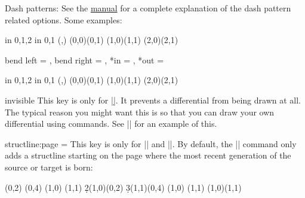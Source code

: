 \begin{sseqdata}[|| name = ex1, cohomological Serre grading]
\begin{manualentry}{Dash patterns:}
See the \href{\pgfmanualurl#subsubsection.15.3.2}{\tikzpkg\space manual} for a complete explanation of the dash pattern related options. Some examples:
\begin{codeexample}[width = 6cm]
\begin{sseqpage}[ no axes, yscale = 1.6 ]
\foreach \x in {0,1,2} \foreach \y in {0,1} {
    \class(\x,\y)
}
(0,0)(0,1)
(1,0)(1,1)
(2,0)(2,1)
\end{sseqpage}
\end{codeexample}
%
\end{manualentry}

\begin{keylist}{bend left = , bend right = , *in = , *out = }
\begin{codeexample}[width = 6cm]
\begin{sseqpage}[no axes,yscale = 1.6]
\foreach \x in {0,1,2} \foreach \y in {0,1} {
    \class(\x,\y)
}
\structline[bend left = 20](0,0)(0,1)
\structline[bend right = 20](1,0)(1,1)
\structline[in = 20,out = north](2,0)(2,1)
\end{sseqpage}
\end{codeexample}
\end{keylist}

\begin{key}{invisible}
This key is only for |\d|. It prevents a differential from being drawn at all. The typical reason you might want this is so that you can draw your own differential using \tikzpkg\space commands. See |\getdtarget| for an example of this.
\end{key}

\begin{key}{structline:page = }
This key is only for |\structline| and |\structlineoptions|. By default, the |\structline| command only adds a structline starting on the page where the most recent generation of the source or target is born:

\begin{codeexample}[width = 7.6cm]
\begin{sseqdata}[ name = structpage example,
                  title = \page, yscale = 0.53 ]
\class(0,2)
\class(0,4)
\class(1,0)
\class(1,1)
\d2(1,0)(0,2)
\d3(1,1)(0,4)
\replaceclass(1,0)
\replaceclass(1,1)
\structline(1,0)(1,1)
\end{sseqdata}
\printpage[name = structpage example,page = 3]
\qquad
\printpage[name = structpage example,page = 4]
\end{codeexample}


\end{key}
\end{sseqdata}
